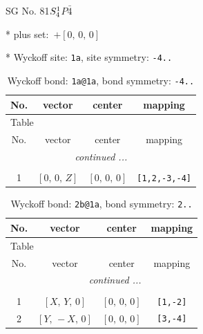 \documentclass[fleqn,8pt]{jsarticle}
\begin{document}
\setcounter{MaxMatrixCols}{32}

\renewcommand{\tablename}{Table~}
\renewcommand{\figurename}{Figure~}
\begin{center}
\LARGE
SG No. 81\quad$S_{\rm 4}^{1}$\quad$P\bar{4}$\quad[ tetragonal ]
\end{center}

* plus set:\,\,\,$+\left[ 0,\, 0,\, 0 \right]$


* Wyckoff site: {\tt 1a}, site symmetry: {\tt -4..}
\renewcommand{\arraystretch}{1.2}
\begin{longtable}{cccc}
\caption{Wyckoff bond: {\tt 1a@1a}, bond symmetry: {\tt -4..}}
 \\
 \hline \hline
No. & vector & center & mapping \\ \hline \endfirsthead

\multicolumn{3}{l}{\tablename\ \thetable{}} \\
 \hline \hline
No. & vector & center & mapping \\ \hline \endhead

 \hline \hline
\multicolumn{3}{r}{\footnotesize\it continued ...} \\ \endfoot

 \hline \hline
\multicolumn{3}{r}{} \\ \endlastfoot

1 & $\left[ 0,\, 0,\, Z \right]$ & $\left[ 0,\, 0,\, 0 \right]$ & {\tt [1,2,-3,-4]} \\
\end{longtable}
\renewcommand{\arraystretch}{1.2}
\begin{longtable}{cccc}
\caption{Wyckoff bond: {\tt 2b@1a}, bond symmetry: {\tt 2..}}
 \\
 \hline \hline
No. & vector & center & mapping \\ \hline \endfirsthead

\multicolumn{3}{l}{\tablename\ \thetable{}} \\
 \hline \hline
No. & vector & center & mapping \\ \hline \endhead

 \hline \hline
\multicolumn{3}{r}{\footnotesize\it continued ...} \\ \endfoot

 \hline \hline
\multicolumn{3}{r}{} \\ \endlastfoot

1 & $\left[ X,\, Y,\, 0 \right]$ & $\left[ 0,\, 0,\, 0 \right]$ & {\tt [1,-2]} \\ \hline
2 & $\left[ Y,\, - X,\, 0 \right]$ & $\left[ 0,\, 0,\, 0 \right]$ & {\tt [3,-4]} \\
\end{longtable}
\end{document}
